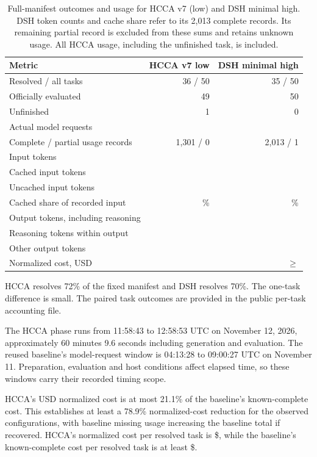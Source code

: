 \documentclass[10pt,a4paper]{article}
\begin{document}
\begin{table}[ht]
\centering
\small
\begin{tabular}{lrr}
\toprule
Metric & HCCA v7 low & DSH minimal high\\
\midrule
Resolved / all tasks & 36 / 50 & 35 / 50\\
Officially evaluated & 49 & 50\\
Unfinished & 1 & 0\\
Actual model requests & \HRequests{} & \BRequests{}\\
Complete / partial usage records & 1,301 / 0 & 2,013 / 1\\
Input tokens & \HInput{} & \BInput{}\\
Cached input tokens & \HCached{} & \BCached{}\\
Uncached input tokens & \HMiss{} & \BMiss{}\\
Cached share of recorded input & \HCachePct{}\% & \BCachePct{}\%\\
Output tokens, including reasoning & \HOutput{} & \BOutput{}\\
Reasoning tokens within output & \HReasoning{} & \BReasoning{}\\
Other output tokens & \HOtherOutput{} & \BOtherOutput{}\\
Normalized cost, USD & \HCost{} & $\geq$\BCost{}\\
\bottomrule
\end{tabular}
\caption{Full-manifest outcomes and usage for HCCA v7 (low) and DSH minimal
high. DSH token counts and cache share
refer to its 2,013 complete records. Its remaining partial record is excluded
from these sums and retains unknown usage. All HCCA usage, including the
unfinished task, is included.}
\label{tab:results}
\end{table}

HCCA resolves 72\% of the fixed manifest and DSH resolves 70\%. The one-task
difference is small. The paired task outcomes are provided in the public
per-task accounting file. \PairedSentence{}

The HCCA phase runs from 11:58:43 to 12:58:53 UTC on November 12, 2026,
approximately 60 minutes 9.6 seconds including generation and evaluation.
The reused baseline's model-request window is 04:13:28 to 09:00:27 UTC on
November 11. Preparation, evaluation and host conditions affect elapsed time,
so these windows carry their recorded timing scope.

HCCA's \HCost{} USD normalized cost is at most 21.1\% of the baseline's
known-complete cost. This establishes at least a 78.9\% normalized-cost
reduction for the observed configurations, with baseline missing usage
increasing the baseline total if recovered. HCCA's normalized cost per resolved
task is \$\HCostPerResolved{}, while the baseline's known-complete cost per
resolved task is at least \$\BCostPerResolved{}.
\end{document}
